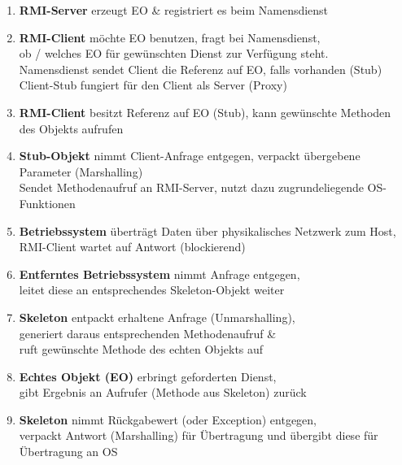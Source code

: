 \documentclass[a4paper]{article}
\begin{document}
			\begin{enumerate}[itemsep=0.5em]
				\item \textbf{RMI-Server} erzeugt EO \& registriert es beim Namensdienst
				
				\item \textbf{RMI-Client} möchte EO benutzen, fragt bei Namensdienst,\\
				ob / welches EO für gewünschten Dienst zur Verfügung steht.\\
				Namensdienst sendet Client die Referenz auf EO, falls vorhanden (Stub)\\
				Client-Stub fungiert für den Client als Server (Proxy)
				
				\item \textbf{RMI-Client} besitzt Referenz auf EO (Stub), kann gewünschte Methoden des Objekts aufrufen
				
				\item \textbf{Stub-Objekt} nimmt Client-Anfrage entgegen, verpackt übergebene Parameter (Marshalling)\\
				Sendet Methodenaufruf an RMI-Server, nutzt dazu zugrundeliegende OS-Funktionen
				
				\item \textbf{Betriebssystem} überträgt Daten über physikalisches Netzwerk zum Host,\\
				RMI-Client wartet auf Antwort (blockierend)
				
				\item \textbf{Entferntes Betriebssystem} nimmt Anfrage entgegen,\\
				leitet diese an entsprechendes Skeleton-Objekt weiter
				
				\item \textbf{Skeleton} entpackt erhaltene Anfrage (Unmarshalling),\\
				generiert daraus entsprechenden Methodenaufruf \& \\
				ruft gewünschte Methode des echten Objekts auf
				
				\item \textbf{Echtes Objekt (EO)} erbringt geforderten Dienst, \\
				gibt Ergebnis an Aufrufer (Methode aus Skeleton) zurück
				
				\item \textbf{Skeleton} nimmt Rückgabewert (oder Exception) entgegen, \\
				verpackt Antwort (Marshalling) für Übertragung und übergibt diese für Übertragung an OS
				

\end{enumerate}
\end{document}
